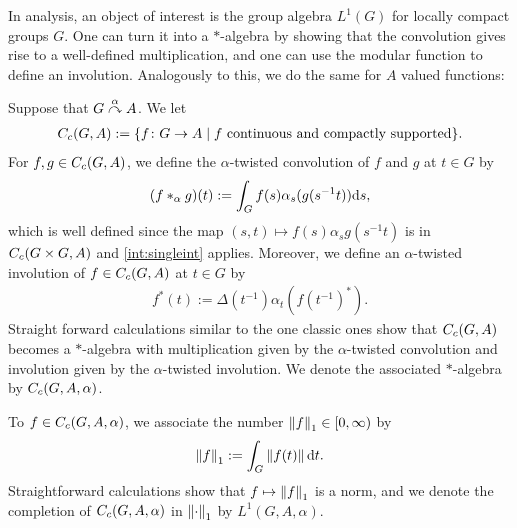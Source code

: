 In analysis, an object of interest is the group algebra $L^1(G)$ for locally compact groups $G$. One can turn it into a $*$-algebra by showing that the convolution gives rise to a well-defined multiplication, and one can use the modular function to define an involution. Analogously to this, we do the same for $A$ valued functions:
\begin{definition}
	Suppose that $G \stackrel{\alpha}{\curvearrowright} A$. We let 
	\begin{align*}
		C_c(G,A):=\{ f \colon G \to A \mid f \text{ continuous and compactly supported}\}.
	\end{align*}
	For $f,g \in C_c(G,A)$, we define the $\alpha$-twisted convolution of $f$ and $g$ at $t \in G$ by
	\begin{align*}
		(f \ast_\alpha g)(t):= \int_G  f(s) \alpha_s(g(s^{-1}t)) \mathrm{d} s,
	\end{align*}
	which is well defined since the map $(s,t) \mapsto f(s) \alpha_s g(s^{-1}t)$ is in $C_c(G \times G , A)$ and \cref{int:singleint} applies. Moreover, we define an $\alpha$-twisted involution of $f \in C_c(G,A)$ at $t \in G$ by
	\begin{align*}
		f^*(t):=\Delta(t^{-1}) \alpha_t(f(t^{-1})^*).
	\end{align*}
	Straight forward calculations similar to the one classic ones show that $C_c(G,A)$ becomes a $*$-algebra with multiplication given by the $\alpha$-twisted convolution and involution given by the $\alpha$-twisted involution. We denote the associated $*$-algebra by $C_c(G,A,\alpha)$.
	
	To $f \in C_c(G,A,\alpha)$, we associate the number $\left\lVert f \right\rVert_1 \in [0, \infty)$ by
		\begin{align*}
			\left\lVert f \right\rVert_1 := \int_G \left\lVert f(t) \right\rVert \mathrm{d} t.
		\end{align*}
	Straightforward calculations show that $f \mapsto \left\lVert f \right\rVert_1$ is a norm, and we denote the completion of $C_c(G,A,\alpha)$ in $\left\lVert \cdot \right\rVert_1$ by $L^1(G,A,\alpha)$.
\end{definition}

